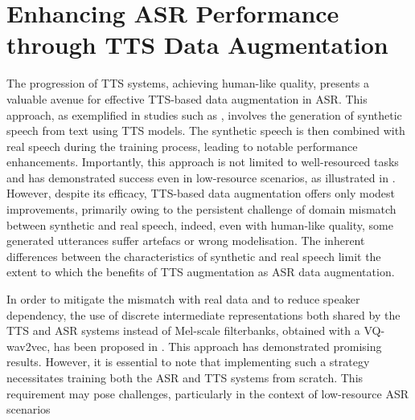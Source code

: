 \section{Enhancing ASR Performance through TTS Data Augmentation}
The progression of TTS systems, achieving human-like quality, presents a valuable avenue for effective TTS-based data augmentation in ASR. This approach, as exemplified in studies such as \cite{laptev2020you}, involves the generation of synthetic speech from text using TTS models. The synthetic speech is then combined with real speech during the training process, leading to notable performance enhancements. Importantly, this approach is not limited to well-resourced tasks and has demonstrated success even in low-resource scenarios, as illustrated in \cite{casanova2022asr}. However, despite its efficacy, TTS-based data augmentation offers only modest improvements, primarily owing to the persistent challenge of domain mismatch between synthetic and real speech, indeed, even with human-like quality, some generated utterances suffer artefacs or wrong modelisation. The inherent differences between the characteristics of synthetic and real speech limit the extent to which the benefits of TTS augmentation as ASR data augmentation. 


In order to mitigate the mismatch with real data and to reduce speaker dependency,  the use of discrete intermediate representations both shared by the TTS and ASR systems instead of Mel-scale filterbanks, obtained with a VQ-wav2vec, has been proposed in \cite{9688218}. This approach has demonstrated promising results. However, it is essential to note that implementing such a strategy necessitates training both the ASR and TTS systems from scratch. This requirement may pose challenges, particularly in the context of low-resource ASR scenarios

